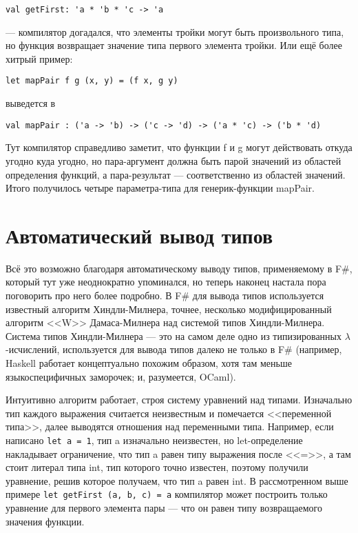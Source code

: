 \documentclass{../../text-style}
\begin{document}
\begin{verbatim}
val getFirst: 'a * 'b * 'c -> 'a
\end{verbatim}

--- компилятор догадался, что элементы тройки могут быть произвольного типа, но функция возвращает значение типа первого элемента тройки. Или ещё более хитрый пример:

\begin{verbatim}
let mapPair f g (x, y) = (f x, g y)
\end{verbatim}

выведется в 

\begin{verbatim}
val mapPair : ('a -> 'b) -> ('c -> 'd) -> ('a * 'c) -> ('b * 'd)
\end{verbatim}

Тут компилятор справедливо заметит, что функции f и g могут действовать откуда угодно куда угодно, но пара-аргумент должна быть парой значений из областей определения функций, а пара-результат --- соответственно из областей значений. Итого получилось четыре параметра-типа для генерик-функции mapPair.

\section{Автоматический вывод типов}

Всё это возможно благодаря автоматическому выводу типов, применяемому в F\#, который тут уже неоднократно упоминался, но теперь наконец настала пора поговорить про него более подробно. В F\# для вывода типов используется известный алгоритм Хиндли-Милнера, точнее, несколько модифицированный алгоритм <<W>> Дамаса-Милнера над системой типов Хиндли-Милнера. Система типов Хиндли-Милнера --- это на самом деле одно из типизированных $\lambda$-исчислений, используется для вывода типов далеко не только в F\# (например, Haskell работает концептуально похожим образом, хотя там меньше языкоспецифичных заморочек; и, разумеется, OCaml).

Интуитивно алгоритм работает, строя систему уравнений над типами. Изначально тип каждого выражения считается неизвестным и помечается <<переменной типа>>, далее выводятся отношения над переменными типа. Например, если написано \texttt{let a = 1}, тип a изначально неизвестен, но let-определение накладывает ограничение, что тип a равен типу выражения после <<=>>, а там стоит литерал типа int, тип которого точно известен, поэтому получили уравнение, решив которое получаем, что тип a равен int. В рассмотренном выше примере \texttt{let getFirst (a, b, c) = a} компилятор может построить только уравнение для первого элемента пары --- что он равен типу возвращаемого значения функции. 
\end{document}
